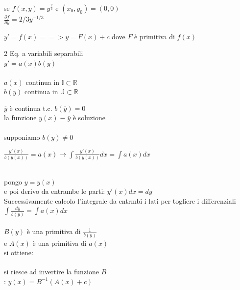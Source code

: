 \documentclass[a4paper, oneside]{article}
\begin{document}
    \begin{example}
    se $f(x,y) = y^{\frac{2}{3}}$ e $(x_0, y_0) = (0,0)$
    \\$\frac{\partial f}{\partial y} = 2/3 y^{-1/3}$
    
    \end{example}
    
\begin{problem}
        $y' = f(x) ==> y= F(x) + c$ dove $F$ è primitiva di $f(x)$
    \begin{multicols}{2}
        \noindent
    Eq. a variabili separabili
    \\$y' = a(x) b(y)$
    \columnbreak
    \\\\ $a(x)$ continua in $\mathbb{I} \subset \mathbb{R}$
    \\ $b(y)$ continua in $\mathbb{J} \subset \mathbb{R}$
    \end{multicols}
\end{problem}

\begin{solution}
     
     $\overline{y}$ è continua t.c. $b(\overline{y}) = 0$
    \\ la funzione $y(x) \equiv \overline{y}$ è soluzione
    \\\\supponiamo $b(y) \neq 0$

    $\frac{y'(x)}{b(y(x))}= a(x) \to \int\frac{y'(x)}{b(y(x))}dx = \int{a(x) dx}$

    \hfil\\ pongo $y= y(x)$
    \\e poi derivo da entrambe le parti: $y'(x)dx = dy$
    \\Successivamente calcolo l'integrale da entrmbi i lati per togliere i differenziali $\int \frac{dy}{b(y)}  = \int a(x) dx$
    \\\\ $B(y)$ è una primitiva di $\frac{1}{b(y)}$
    \\e $A(x)$ è una primitiva di $a(x)$
    \\si ottiene:
    \\
    \\ si riesce ad invertire la funzione $B$
    \\: $y(x) = B^{-1}(A(x) + c)$    
    

\end{solution}
   
\end{document}
